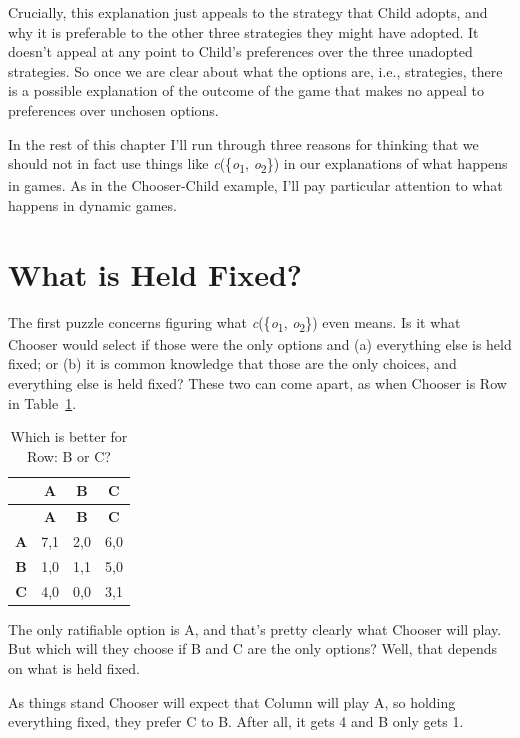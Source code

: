 \documentclass[
  12pt,
  letterpaper,
  DIV=11,
  numbers=noendperiod]{scrreprt}
\begin{document}
Crucially, this explanation just appeals to the strategy that Child
adopts, and why it is preferable to the other three strategies they
might have adopted. It doesn't appeal at any point to Child's
preferences over the three unadopted strategies. So once we are clear
about what the options are, i.e., strategies, there is a possible
explanation of the outcome of the game that makes no appeal to
preferences over unchosen options.

In the rest of this chapter I'll run through three reasons for thinking
that we should not in fact use things like
\emph{c}(\{\emph{o}\textsubscript{1}, \emph{o}\textsubscript{2}\}) in
our explanations of what happens in games. As in the Chooser-Child
example, I'll pay particular attention to what happens in dynamic games.

\section{What is Held Fixed?}\label{sec-held-fixed}

The first puzzle concerns figuring what
\emph{c}(\{\emph{o}\textsubscript{1}, \emph{o}\textsubscript{2}\}) even
means. Is it what Chooser would select if those were the only options
and (a) everything else is held fixed; or (b) it is common knowledge
that those are the only choices, and everything else is held fixed?
These two can come apart, as when Chooser is Row in
Table~\ref{tbl-held-fixed}.

\begin{longtable}[]{@{}cccc@{}}
\caption{Which is better for Row: B or
C?}\label{tbl-held-fixed}\tabularnewline
\toprule\noalign{}
& \textbf{A} & \textbf{B} & \textbf{C} \\
\midrule\noalign{}
\endfirsthead
\toprule\noalign{}
& \textbf{A} & \textbf{B} & \textbf{C} \\
\midrule\noalign{}
\endhead
\bottomrule\noalign{}
\endlastfoot
\textbf{A} & 7,1 & 2,0 & 6,0 \\
\textbf{B} & 1,0 & 1,1 & 5,0 \\
\textbf{C} & 4,0 & 0,0 & 3,1 \\
\end{longtable}

The only ratifiable option is A, and that's pretty clearly what Chooser
will play. But which will they choose if B and C are the only options?
Well, that depends on what is held fixed.

As things stand Chooser will expect that Column will play A, so holding
everything fixed, they prefer C to B. After all, it gets 4 and B only
gets 1.
\end{document}
